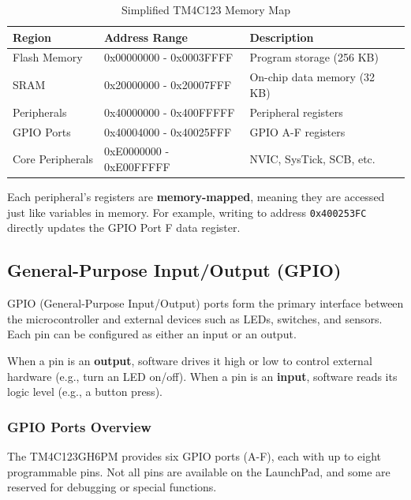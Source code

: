 \begin{table}[H]
\centering
\small
\begin{tabular}{lll}
\toprule
\textbf{Region} & \textbf{Address Range} & \textbf{Description} \\
\midrule
Flash Memory & 0x00000000 - 0x0003FFFF & Program storage (256 KB) \\
SRAM & 0x20000000 - 0x20007FFF & On-chip data memory (32 KB) \\
Peripherals & 0x40000000 - 0x400FFFFF & Peripheral registers \\
GPIO Ports & 0x40004000 - 0x40025FFF & GPIO A-F registers \\
Core Peripherals & 0xE0000000 - 0xE00FFFFF & NVIC, SysTick, SCB, etc. \\
\bottomrule
\end{tabular}
\caption{Simplified TM4C123 Memory Map}
\end{table}

\noindent
Each peripheral's registers are \textbf{memory-mapped}, meaning they are accessed just like variables in memory.  
For example, writing to address \texttt{0x400253FC} directly updates the GPIO Port F data register.


\subsection{General-Purpose Input/Output (GPIO)}

GPIO (General-Purpose Input/Output) ports form the primary interface between the microcontroller and external devices such as LEDs, switches, and sensors. Each pin can be configured as either an input or an output.

When a pin is an \textbf{output}, software drives it high or low to control external hardware (e.g., turn an LED on/off).  
When a pin is an \textbf{input}, software reads its logic level (e.g., a button press).

\subsubsection{GPIO Ports Overview}

The TM4C123GH6PM provides six GPIO ports (A-F), each with up to eight programmable pins. Not all pins are available on the LaunchPad, and some are reserved for debugging or special functions.

